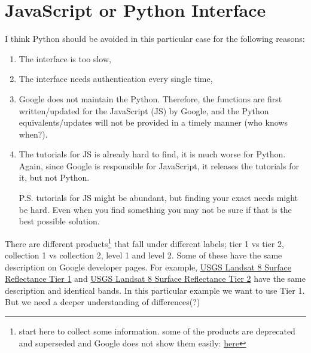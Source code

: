 \section{JavaScript or Python Interface}
I think Python should be avoided in
this particular case for the following reasons:
\begin{enumerate}
    \item The interface is too slow,
    \item The interface needs authentication every 
          single time,
    \item Google does not maintain the Python. Therefore,
          the functions are first written/updated for
          the JavaScript (JS) by Google,
          and the Python
          equivalents/updates will not be provided 
          in a timely manner (who knows when?).
    \item The tutorials for JS is already 
          hard to find, it is much worse for Python. 
          Again, since Google is responsible for
          JavaScript, it releases the
          tutorials for it, but not Python.
          
          P.S. tutorials for JS might be abundant,
          but finding your exact needs might be hard.
          Even when you find something you may not
          be sure if that is the best possible
          solution.
\end{enumerate}

There are different products\footnote{start here to collect some information. some of the products are deprecated and superseded and Google does not show them easily: \href{https://developers.google.com/earth-engine/datasets/catalog/landsat}{here}} that fall under 
different labels; tier 1 vs tier 2, collection 1 vs collection 2, level 1 and level 2.
Some of these have the same description on 
Google developer pages. For example, 
\href{https://developers.google.com/earth-engine/datasets/catalog/LANDSAT_LC08_C01_T1_SR#description}{USGS Landsat 8 Surface Reflectance Tier 1}
and \href{https://developers.google.com/earth-engine/datasets/catalog/LANDSAT_LC08_C01_T2_SR#description}{USGS Landsat 8 Surface Reflectance Tier 2}
have the same description and identical bands. In this particular example
we want to use Tier 1. But we need a deeper understanding of differences(?)

